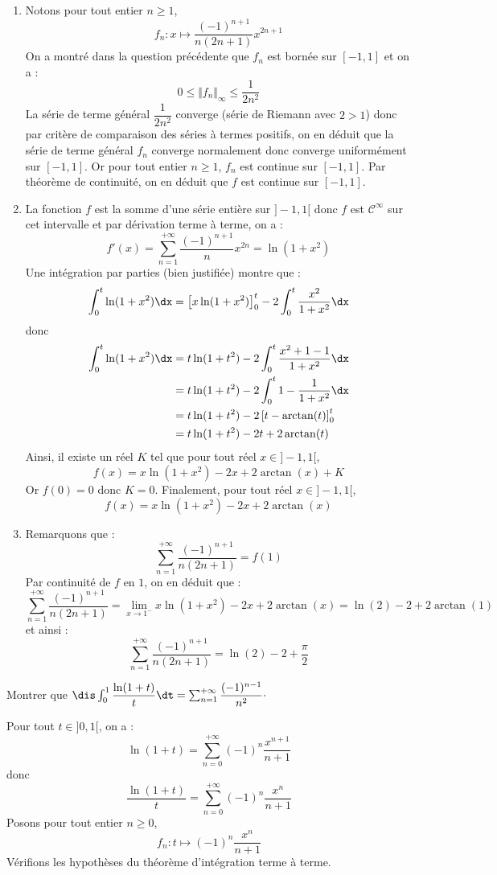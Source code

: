 \documentclass[a4paper,10pt]{report}
\begin{document}
\begin{enumerate}
\item Notons pour tout entier $n \geq 1$,
$$ f_n : x \mapsto \dfrac{(-1)^{n+1}}{n(2n+1)} x^{2n+1}$$
On a montré dans la question précédente que $f_n$ est bornée sur $[-1,1]$ et on a :
$$ 0 \leq \Vert f_n \Vert_{\infty} \leq  \dfrac{1}{2n^2}$$
La série de terme général $\dfrac{1}{2n^2}$ converge (série de Riemann avec $2>1$) donc par critère de comparaison des séries à termes positifs, on en déduit que la série de terme général $f_n$ converge normalement donc converge uniformément sur $[-1,1]$. Or pour tout entier $n \geq 1$, $f_n$ est continue sur $[-1,1]$. Par théorème de continuité, on en déduit que $f$ est continue sur $[-1,1]$.
\item La fonction $f$ est la somme d'une série entière sur $]-1,1[$ donc $f$ est $\mathcal{C}^{\infty}$ sur cet intervalle et par dérivation terme à terme, on a :
$$ f'(x) = \sum_{n=1}^{+ \infty}  \dfrac{(-1)^{n+1}}{n} x^{2n} = \ln(1+x^2)$$
Une intégration par parties (bien justifiée) montre que :
$$ \int_0^{t} \ln(1+x^2) \dx = \left[ x \ln(1+x^2) \right]_0^t - 2\int_0^t \dfrac{x^2}{1+x^2} \dx$$
donc 
\begin{align*}
 \int_0^{t} \ln(1+x^2) \dx & =  t \ln(1+t^2)  - 2\int_0^t \dfrac{x^2+1-1}{1+x^2} \dx \\
 & = t \ln(1+t^2)  - 2\int_0^t 1 - \dfrac{1}{1+x^2} \dx \\
 & = t \ln(1+t^2) - 2 \left[ t - \arctan(t) \right]_0^t \\
 & = t \ln(1+t^2) - 2t + 2 \arctan(t)
\end{align*}
Ainsi, il existe un réel $K$ tel que pour tout réel $x \in ]-1,1[$,
$$ f(x) = x \ln(1+x^2) - 2x + 2 \arctan(x) + K$$
Or $f(0)=0$ donc $K=0$. Finalement, pour tout réel $x \in ]-1,1[$,
$$ f(x) = x \ln(1+x^2) - 2x + 2 \arctan(x) $$
\item Remarquons que :
$$ \sum_{n=1}^{+ \infty} \dfrac{(-1)^{n+1}}{n(2n+1)}  = f(1)$$
Par continuité de $f$ en $1$, on en déduit que :
$$ \sum_{n=1}^{+ \infty} \dfrac{(-1)^{n+1}}{n(2n+1)} = \lim_{x \rightarrow 1^{-}}  x \ln(1+x^2) - 2x + 2 \arctan(x) =\ln(2)-2+ 2 \arctan(1)$$
et ainsi :
$$ \sum_{n=1}^{+ \infty} \dfrac{(-1)^{n+1}}{n(2n+1)} = \ln(2)-2 + \dfrac{\pi}{2}$$
\end{enumerate}

\begin{Exercice}{} Montrer que $\dis \int_{0}^1 \dfrac{\ln(1+t)}{t}\dt = \sum_{n=1}^{+ \infty} \dfrac{(-1)^{n-1}}{n^2} \cdot$
\end{Exercice}

\corr Pour tout $t \in ]0,1[$, on a :
$$ \ln(1+t) = \sum_{n=0}^{+ \infty} (-1)^{n} \dfrac{x^{n+1}}{n+1}$$
donc
$$ \dfrac{\ln(1+t)}{t} = \sum_{n=0}^{+ \infty} (-1)^{n} \dfrac{x^{n}}{n+1}$$
Posons pour tout entier $n \geq 0$,
$$ f_n : t \mapsto (-1)^{n} \dfrac{x^{n}}{n+1}$$
Vérifions les hypothèses du théorème d'intégration terme à terme.
\end{document}
